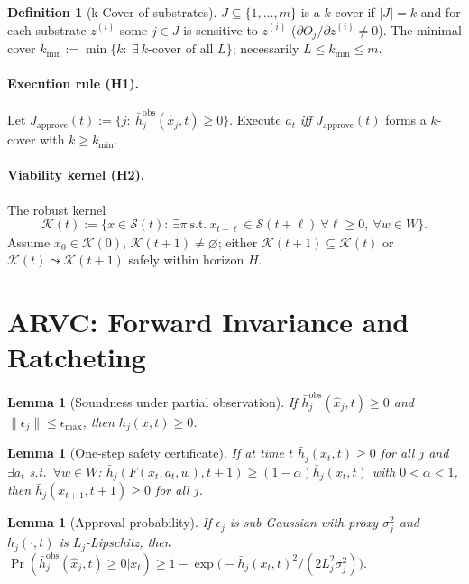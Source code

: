 \documentclass[11pt]{article}
\newtheorem{lemma}[theorem]{Lemma}
\theoremstyle{definition}
\newtheorem{definition}[theorem]{Definition}
\newcommand{\K}{\mathcal{K}}
\newcommand{\Sset}{\mathcal{S}}
\begin{document}
\begin{definition}[k-Cover of substrates]\label{def:kcover}
$J\subseteq\{1,\dots,m\}$ is a $k$-cover if $|J|=k$ and for each substrate $z^{(i)}$ some $j\in J$ is sensitive to $z^{(i)}$ ($\partial O_j/\partial z^{(i)}\neq 0$). The minimal cover $k_{\min}:=\min\{k:\ \exists\ k\text{-cover of all }L\}$; necessarily $L\le k_{\min}\le m$.
\end{definition}

\paragraph{Execution rule (H1).} Let $J_{\mathrm{approve}}(t):=\{j:\ \bar h^{\mathrm{obs}}_j(\hat x_j,t)\ge 0\}$. Execute $a_t$ \emph{iff} $J_{\mathrm{approve}}(t)$ forms a $k$-cover with $k\ge k_{\min}$.

\paragraph{Viability kernel (H2).} The robust kernel
\[
\K(t):=\{x\in \Sset(t):\ \exists \pi\ \text{s.t.}\ x_{t+\ell}\in \Sset(t+\ell)\ \forall \ell\ge 0,\ \forall w\in W\}.
\]
Assume $x_0\in \K(0)$, $\K(t+1)\neq\varnothing$; either $\K(t+1)\subseteq \K(t)$ or $\K(t)\leadsto \K(t+1)$ safely within horizon $H$.

\section{ARVC: Forward Invariance and Ratcheting}
\begin{lemma}[Soundness under partial observation]\label{lem:sound}
If $\bar h^{\mathrm{obs}}_j(\hat x_j,t)\ge 0$ and $\|\epsilon_j\|\le \epsilon_{\max}$, then $h_j(x,t)\ge 0$.
\end{lemma}

\begin{lemma}[One-step safety certificate]\label{lem:oneStep}
If at time $t$ $\bar h_j(x_t,t)\ge 0$ for all $j$ and $\exists a_t$ s.t.\ $\forall w\in W$: $\bar h_j(F(x_t,a_t,w),t{+}1)\ge (1-\alpha)\bar h_j(x_t,t)$ with $0<\alpha<1$, then $\bar h_j(x_{t+1},t{+}1)\ge 0$ for all $j$.
\end{lemma}

\begin{lemma}[Approval probability]\label{lem:concentration}
If $\epsilon_j$ is sub-Gaussian with proxy $\sigma_j^2$ and $h_j(\cdot,t)$ is $L_j$-Lipschitz, then
\(
\Pr(\bar h^{\mathrm{obs}}_j(\hat x_j,t)\ge 0|x_t)\ge 1-\exp\!\big(-\bar h_j(x_t,t)^2/(2L_j^2\sigma_j^2)\big).
\)
\end{lemma}
\end{document}
